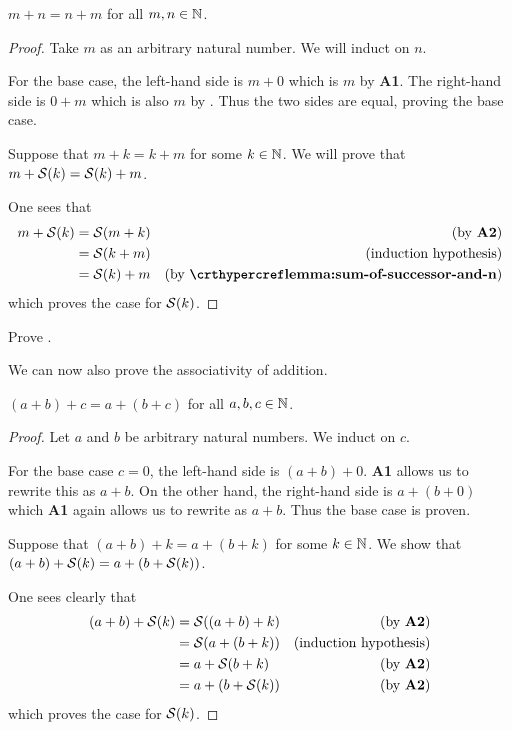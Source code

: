 \begin{theorem}\label{theorem:addition-commutative-naturals}
    $m + n = n + m$ for all $m, n \in \mathbb{N}$.
\end{theorem}
\begin{proof}
    Take $m$ as an arbitrary natural number. We will induct on $n$.

    For the base case, the left-hand side is $m + 0$ which is $m$ by \textbf{A1}. The right-hand side is $0 + m$ which is also $m$ by . Thus the two sides are equal, proving the base case.

    Suppose that $m + k = k + m$ for some $k \in \mathbb{N}$. We will prove that $m + {\mathcal{S}(k)} = {\mathcal{S}(k)} + m$.

    One sees that
    \begin{align*}
        m + \Successor{k} &= \Successor{m + k} & (\text{by \textbf{A2}})\\
        &= \Successor{k + m} & (\text{induction hypothesis})\\
        &= \Successor{k} + m & (\text{by \myref{lemma:sum-of-successor-and-n}})
    \end{align*}
    which proves the case for ${\mathcal{S}(k)}$.
\end{proof}

\begin{exercise}\label{exercise:sum-of-successor-and-n}
    Prove .
\end{exercise}

We can now also prove the associativity of addition.

\begin{theorem}\label{theorem:addition-associative-naturals}
    $(a + b) + c = a + (b + c)$ for all $a,b,c \in \mathbb{N}$.
\end{theorem}
\begin{proof}
    Let $a$ and $b$ be arbitrary natural numbers. We induct on $c$.

    For the base case $c = 0$, the left-hand side is $(a + b) + 0$. \textbf{A1} allows us to rewrite this as $a+b$. On the other hand, the right-hand side is $a + (b + 0)$ which \textbf{A1} again allows us to rewrite as $a + b$. Thus the base case is proven.

    Suppose that $(a + b) + k = a + (b + k)$ for some $k \in \mathbb{N}$. We show that $(a + b) + {\mathcal{S}(k)} = a + (b + {\mathcal{S}(k)})$.

    One sees clearly that
    \begin{align*}
        (a + b) + {\mathcal{S}(k)} &= {\mathcal{S}((a + b) + k)} & (\text{by \textbf{A2}})\\
        &= {\mathcal{S}(a + (b + k))} & (\text{induction hypothesis})\\
        &= a + {\mathcal{S}(b + k)} & (\text{by \textbf{A2}})\\
        &= a + (b + {\mathcal{S}(k)}) & (\text{by \textbf{A2}})
    \end{align*}
    which proves the case for ${\mathcal{S}(k)}$.
\end{proof}

